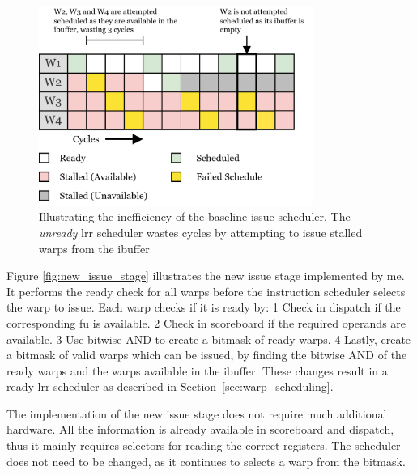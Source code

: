 \begin{figure}
    \centering
    \includegraphics[width=0.8\textwidth]{figures/old_lrr_scheduler.png}
    \caption{Illustrating the inefficiency of the baseline issue scheduler. The \textit{unready} \acrshort{lrr} scheduler wastes cycles by attempting to issue stalled warps from the ibuffer}
    \label{fig:unready_lrr}
\end{figure}

Figure \ref{fig:new_issue_stage} illustrates the new issue stage implemented by me. It performs the ready check for all warps before the instruction scheduler selects the warp to issue. Each warp checks if it is ready by: \textcircled{\small{1}} Check in dispatch if the corresponding \acrshort{fu} is available. \textcircled{\small{2}} Check in scoreboard if the required operands are available. \textcircled{\small{3}} Use bitwise AND to create a bitmask of ready warps. \textcircled{\small{4}} Lastly, create a bitmask of valid warps which can be issued, by finding the bitwise AND of the ready warps and the warps available in the ibuffer. These changes result in a ready \acrfull{lrr} scheduler as described in Section~\ref{sec:warp_scheduling}.

The implementation of the new issue stage does not require much additional hardware. All the information is already available in scoreboard and dispatch, thus it mainly requires selectors for reading the correct registers. The scheduler does not need to be changed, as it continues to selects a warp from the bitmask. 

